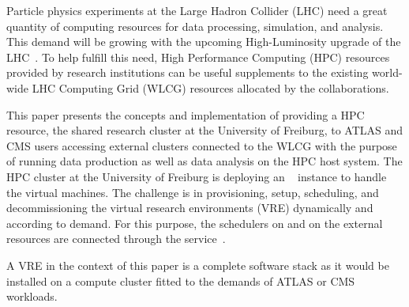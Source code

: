 
Particle physics experiments at the Large Hadron Collider (LHC) need a
great quantity of computing resources for data processing, simulation, and analysis.
This demand will be growing with the upcoming High-Luminosity upgrade of the LHC~\cite{HLLHCcompneeds}.
To help fulfill this need, High Performance Computing (HPC) resources provided by research institutions
can be useful supplements to the existing world-wide LHC Computing
Grid (WLCG) resources
allocated by the collaborations.


This paper presents the concepts and implementation of providing a HPC resource, the
shared research cluster \NEMO at the University of Freiburg, to ATLAS and CMS users accessing external clusters connected to the WLCG with the purpose of running data production as well as
data analysis on the HPC host system. The HPC cluster \NEMO at
the University of Freiburg is deploying an \Openstack~\cite{Openstack} instance to handle the
virtual machines. The challenge is in provisioning, setup, scheduling, and decommissioning the virtual research environments (VRE) dynamically and according to demand. For this purpose, the schedulers on \NEMO and on the external resources are
connected through the \Roced service~\cite{ROCED}.

A VRE in the context of this paper is a complete software stack
as it would be installed on a compute cluster fitted to the demands of ATLAS or CMS workloads.

